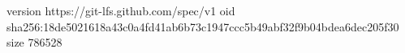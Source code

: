 version https://git-lfs.github.com/spec/v1
oid sha256:18de5021618a43c0a4fd41ab6b73c1947ccc5b49abf32f9b04bdea6dec205f30
size 786528
